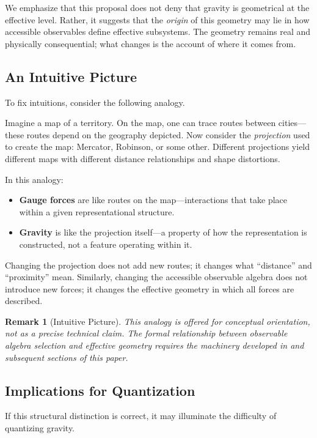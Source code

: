 \documentclass[12pt,a4paper]{article}
\newtheorem{remark}[theorem]{Remark}
\begin{document}
We emphasize that this proposal does not deny that gravity is geometrical at the effective level. Rather, it suggests that the \emph{origin} of this geometry may lie in how accessible observables define effective subsystems. The geometry remains real and physically consequential; what changes is the account of where it comes from.

\subsection{An Intuitive Picture}

To fix intuitions, consider the following analogy.

Imagine a map of a territory. On the map, one can trace routes between cities—these routes depend on the geography depicted. Now consider the \emph{projection} used to create the map: Mercator, Robinson, or some other. Different projections yield different maps with different distance relationships and shape distortions.

In this analogy:
\begin{itemize}
    \item \textbf{Gauge forces} are like routes on the map—interactions that take place within a given representational structure.
    \item \textbf{Gravity} is like the projection itself—a property of how the representation is constructed, not a feature operating within it.
\end{itemize}

Changing the projection does not add new routes; it changes what ``distance'' and ``proximity'' mean. Similarly, changing the accessible observable algebra does not introduce new forces; it changes the effective geometry in which all forces are described.

\begin{remark}[Intuitive Picture]
This analogy is offered for conceptual orientation, not as a precise technical claim. The formal relationship between observable algebra selection and effective geometry requires the machinery developed in \cite{Liu2026PaperA} and subsequent sections of this paper.
\end{remark}

\subsection{Implications for Quantization}

If this structural distinction is correct, it may illuminate the difficulty of quantizing gravity.
\end{document}
